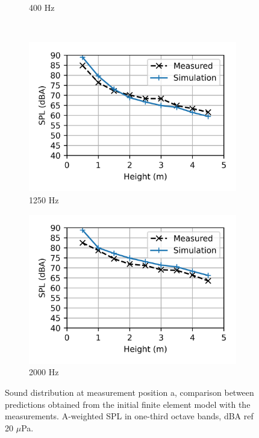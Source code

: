 \begin{figure}
\begin{subfigure}[b]{0.49\textwidth}
		\caption{400 Hz}
	\end{subfigure}
	\\
	\begin{subfigure}[b]{0.49\textwidth}
		\centering
		\includegraphics{fig/chap5/initial_model/third_octave_over_height/1250_Hz.png}
		\caption{1250 Hz}
	\end{subfigure}
	\hfill
	\begin{subfigure}[b]{0.49\textwidth}
		\centering
		\includegraphics{fig/chap5/initial_model/third_octave_over_height/2000_Hz.png}
		\caption{2000 Hz}
	\end{subfigure}
	\caption{Sound distribution at measurement position a, comparison between predictions obtained from the initial finite element model with the measurements. A-weighted SPL in one-third octave bands, dBA ref 20 $\mu$Pa.}
	\label{fig:third_octave_over_height}
\end{figure}

